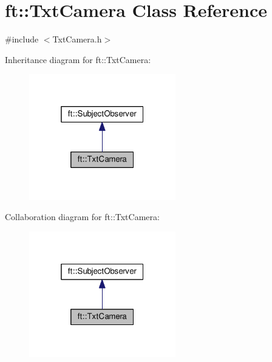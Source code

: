 \hypertarget{classft_1_1_txt_camera}{}\section{ft\+:\+:Txt\+Camera Class Reference}
\label{classft_1_1_txt_camera}


{\ttfamily \#include $<$Txt\+Camera.\+h$>$}



Inheritance diagram for ft\+:\+:Txt\+Camera\+:
\nopagebreak
\begin{figure}[H]
\begin{center}
\leavevmode
\includegraphics[width=181pt]{classft_1_1_txt_camera__inherit__graph}
\end{center}
\end{figure}


Collaboration diagram for ft\+:\+:Txt\+Camera\+:
\nopagebreak
\begin{figure}[H]
\begin{center}
\leavevmode
\includegraphics[width=181pt]{classft_1_1_txt_camera__coll__graph}
\end{center}
\end{figure}
